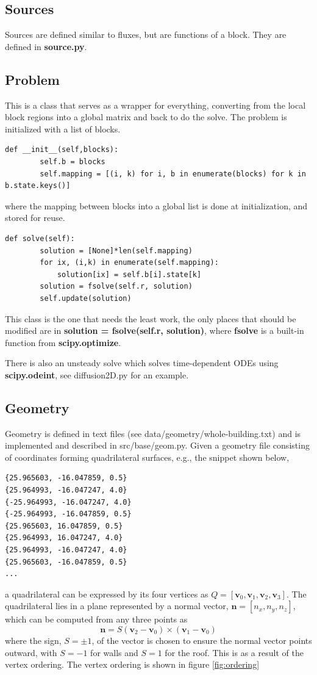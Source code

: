 \documentclass[11pt]{article}
\begin{document}
\subsection{Sources}
Sources are defined similar to fluxes, but are functions of a block. They are defined in {\bf source.py}.
\subsection{Problem}
This is a class that serves as a wrapper for everything, converting from the local block regions into a global matrix and back to do the solve. The problem is initialized with a list of blocks.
\begin{verbatim}
def __init__(self,blocks):
		self.b = blocks
		self.mapping = [(i, k) for i, b in enumerate(blocks) for k in b.state.keys()]
\end{verbatim}
where the mapping between blocks into a global list is done at initialization, and stored for reuse. 
\begin{verbatim}
def solve(self):
		solution = [None]*len(self.mapping)
		for ix, (i,k) in enumerate(self.mapping):
			solution[ix] = self.b[i].state[k]
		solution = fsolve(self.r, solution)
		self.update(solution)
\end{verbatim}
This class is the one that needs the least work, the only places that should be modified are in {\bf solution = fsolve(self.r, solution)}, where {\bf fsolve} is a built-in function from {\bf scipy.optimize}.

There is also an unsteady solve which solves time-dependent ODEs using {\bf scipy.odeint}, see diffusion2D.py for an example.

\subsection{Geometry}

Geometry is defined in text files (see data/geometry/whole-building.txt) and is implemented and described in src/base/geom.py. Given a geometry file consisting of coordinates forming quadrilateral surfaces, e.g., the snippet shown below,
\begin{verbatim}
{25.965603, -16.047859, 0.5}
{25.964993, -16.047247, 4.0}
{-25.964993, -16.047247, 4.0}
{-25.964993, -16.047859, 0.5}
{25.965603, 16.047859, 0.5}
{25.964993, 16.047247, 4.0}
{25.964993, -16.047247, 4.0}
{25.965603, -16.047859, 0.5}
...
\end{verbatim}
a quadrilateral can be expressed by its four vertices as $Q = [\mathbf{v}_0,\mathbf{v}_1,\mathbf{v}_2,\mathbf{v}_3]$. The quadrilateral lies in a plane represented by a normal vector, $\mathbf{n} = [n_x,n_y,n_z]$, which can be computed from any three points as 
\[
\mathbf{n} = S(\mathbf{v}_2-\mathbf{v}_0)\times (\mathbf{v}_1-\mathbf{v}_0)
\]
where the sign, $S = \pm 1$, of the vector is chosen to ensure the normal vector points outward, with $S = -1$ for walls and $S = 1$ for the roof. This is as a result of the vertex ordering. The vertex ordering is shown in figure \ref{fig:ordering}
\end{document}

